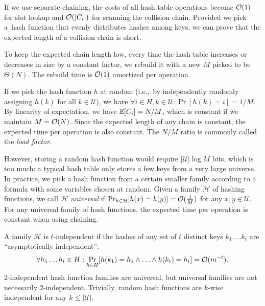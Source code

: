 If we use separate chaining, the costs of all hash table operations become
$\mathcal{O}(1)$ for slot lookup and $\mathcal{O}(|C_i|)$ for scanning the collision chain.
Provided we pick a~hash function that evenly distributes hashes among keys,
we can prove that the expected length of a collision chain is short.

To keep the expected chain length low, every time the hash table increases
or decreases in size by a constant factor, we rebuild it with a new $M$
picked to be $\Theta(N)$. The rebuild time is $\mathcal{O}(1)$ amortized per operation.

If we pick the hash function $h$ at random (i.e.,\ by independently randomly
assigning $h(k)$ for all $k\in\mathcal{U}$), we have $\forall i\in H,
k\in\mathcal{U}: \Pr[h(k)=i]=1/M$.
By linearity of expectation, we have $\mathbb{E}[C_i]=N/M$, which is
constant if we maintain $M=\mathcal{O}(N)$. Since the expected length of any chain
is constant, the expected time per operation is also constant.
The $N/M$ ratio is commonly called the \emph{load factor}.

However, storing a random hash function would require $|\mathcal{U}|\log M$
bits, which is too much: a typical hash table only stores a few keys from a
very large universe.
In practice, we pick a hash function from a certain smaller family according to
a formula with some variables chosen at random.
Given a family $\mathcal{H}$ of hashing functions, we call $\mathcal{H}$
\emph{universal} if $\Pr_{h\in \mathcal{H}}[h(x)=h(y)]=\mathcal{O}(\frac{1}{M})$ for any
$x, y\in\mathcal{U}$.
For any universal family of hash functions, the expected time per operation
is constant when using chaining.

A family $\mathcal{H}$ is $t$-independent if the hashes of any set of $t$
distinct keys $k_1,\ldots k_t$ are ``asymptotically independent'':
$$\forall h_1\ldots h_t\in H: \Pr_{h\in H}[h(k_1)=h_1\wedge \ldots \wedge
	h(k_t)=h_t]=\mathcal{O}(m^{-t}).$$
2-independent hash function families are universal, but universal families
are not necessarily 2-independent.
Trivially, random hash functions are $k$-wise independent for any
$k\leq|\mathcal{U}|$.


